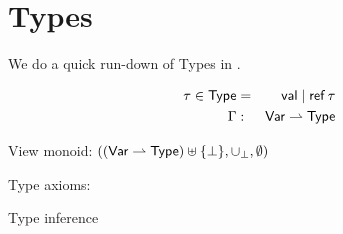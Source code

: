 \section{Types}

We do a quick run-down of Types in \cite{conf/popl/Dinsdale-YoungBGPY13}.


\begin{eqnarray*}
  \tau \in \mathsf{Type} &=& \mathsf{val} \mid \mathop{\mathsf{ref}} \tau
\\ \Gamma &:& \mathsf{Var} \rightharpoonup \mathsf{Type}
\end{eqnarray*}

View monoid: $((\mathsf{Var} \rightharpoonup \mathsf{Type})\uplus\{\bot\},\cup_\bot,\emptyset)$

Type axioms:

\def\op{\mathbin{\mathsf{op}}}
Type inference
